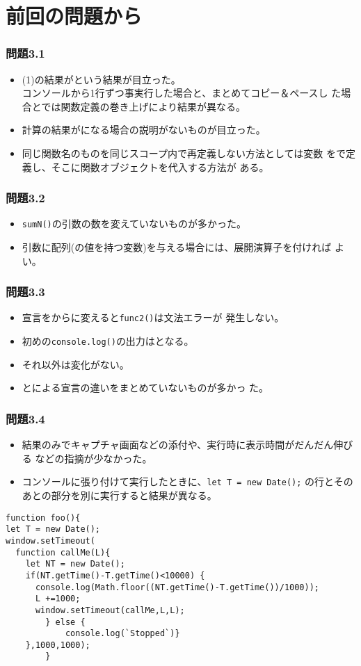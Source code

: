 \section{前回の問題から}
 \begin{frame}[containsverbatim]
  \frametitle{問題3.1}
  \begin{itemize}
   \item (1)の結果がという結果が目立った。\\
         コンソールから1行ずつ事実行した場合と、まとめてコピー＆ペースし
         た場合とでは関数定義の巻き上げにより結果が異なる。
   \item 計算の結果がになる場合の説明がないものが目立った。
   \item 同じ関数名のものを同じスコープ内で再定義しない方法としては変数
         をで定義し、そこに関数オブジェクトを代入する方法が
         ある。
  \end{itemize}
 \end{frame}
\begin{frame}[containsverbatim]
 \frametitle{問題3.2}
 \begin{itemize}
  \item \texttt{sumN()}の引数の数を変えていないものが多かった。
  \item 引数に配列(の値を持つ変数)を与える場合には、展開演算子を付ければ
        よい。
 \end{itemize}
\end{frame}
\begin{frame}[containsverbatim]
 \frametitle{問題3.3}
 \begin{itemize}
  \item 宣言をからに変えると\texttt{func2()}は文法エラーが
 発生しない。
  \item 初めの\Verb+console.log()+の出力はとなる。
  \item それ以外は変化がない。
  \item {}とによる宣言の違いをまとめていないものが多かっ
        た。
 \end{itemize}
\end{frame}
\begin{frame}[containsverbatim]
 \frametitle{問題3.4}
\begin{itemize}
 \item 結果のみでキャプチャ画面などの添付や、実行時に表示時間がだんだん伸びる
 などの指摘が少なかった。
 \item コンソールに張り付けて実行したときに、\Verb+let T = new Date();+
       の行とそのあとの部分を別に実行すると結果が異なる。
\end{itemize}
 \begin{Verbatim}[fontsize=\footnotesize]
function foo(){
let T = new Date();
window.setTimeout(
  function callMe(L){
    let NT = new Date();
    if(NT.getTime()-T.getTime()<10000) {
      console.log(Math.floor((NT.getTime()-T.getTime())/1000));
      L +=1000;
      window.setTimeout(callMe,L,L);
    	} else {
			console.log(`Stopped`)}
   	},1000,1000);
		}
\end{Verbatim}
\end{frame}
